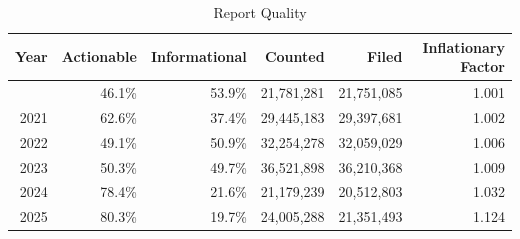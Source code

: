 \begin{table}[!t]
\caption*{
{\large Report Quality}
} 

\fontsize{12.0pt}{14.4pt}\selectfont

\begin{tabular*}{\linewidth}{@{\extracolsep{\fill}}rrrrrr}
\toprule
Year & Actionable & Informational & Counted & Filed & Inflationary Factor \\ 
\midrule\addlinespace[2.5pt]
2020 & 46.1\% & 53.9\% & 21,781,281 & 21,751,085 & 1.001 \\
2021 & 62.6\% & 37.4\% & 29,445,183 & 29,397,681 & 1.002 \\
2022 & 49.1\% & 50.9\% & 32,254,278 & 32,059,029 & 1.006 \\
2023 & 50.3\% & 49.7\% & 36,521,898 & 36,210,368 & 1.009 \\
2024 & 78.4\% & 21.6\% & 21,179,239 & 20,512,803 & 1.032 \\
2025 & 80.3\% & 19.7\% & 24,005,288 & 21,351,493 & 1.124 \\
\bottomrule
\end{tabular*}

\end{table}
